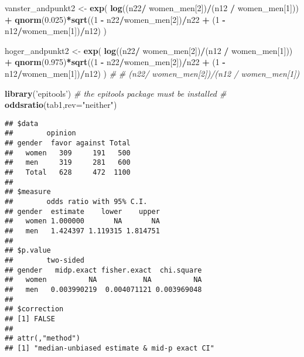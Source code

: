 \documentclass[]{article}
\newenvironment{Shaded}{\begin{snugshade}}{\end{snugshade}}
\newcommand{\CommentTok}[1]{\textcolor[rgb]{0.56,0.35,0.01}{\textit{#1}}}
\newcommand{\DataTypeTok}[1]{\textcolor[rgb]{0.13,0.29,0.53}{#1}}
\newcommand{\DecValTok}[1]{\textcolor[rgb]{0.00,0.00,0.81}{#1}}
\newcommand{\FloatTok}[1]{\textcolor[rgb]{0.00,0.00,0.81}{#1}}
\newcommand{\KeywordTok}[1]{\textcolor[rgb]{0.13,0.29,0.53}{\textbf{#1}}}
\newcommand{\NormalTok}[1]{#1}
\newcommand{\OperatorTok}[1]{\textcolor[rgb]{0.81,0.36,0.00}{\textbf{#1}}}
\newcommand{\StringTok}[1]{\textcolor[rgb]{0.31,0.60,0.02}{#1}}
\begin{document}
\begin{Shaded}
\begin{Highlighting}[]
\NormalTok{vanster_andpunkt2 <-}\StringTok{ }\KeywordTok{exp}\NormalTok{(}
  \KeywordTok{log}\NormalTok{((n22}\OperatorTok{/}\StringTok{ }\NormalTok{women_men[}\DecValTok{2}\NormalTok{])}\OperatorTok{/}\NormalTok{(n12 }\OperatorTok{/}\StringTok{ }\NormalTok{women_men[}\DecValTok{1}\NormalTok{])) }\OperatorTok{+}\StringTok{ }\KeywordTok{qnorm}\NormalTok{(}\FloatTok{0.025}\NormalTok{)}\OperatorTok{*}\KeywordTok{sqrt}\NormalTok{((}\DecValTok{1} \OperatorTok{-}\StringTok{ }\NormalTok{n22}\OperatorTok{/}\NormalTok{women_men[}\DecValTok{2}\NormalTok{])}\OperatorTok{/}\NormalTok{n22 }\OperatorTok{+}\StringTok{ }\NormalTok{(}\DecValTok{1} \OperatorTok{-}\StringTok{ }\NormalTok{n12}\OperatorTok{/}\NormalTok{women_men[}\DecValTok{1}\NormalTok{])}\OperatorTok{/}\NormalTok{n12)}
\NormalTok{)}

\NormalTok{hoger_andpunkt2 <-}\StringTok{ }\KeywordTok{exp}\NormalTok{(}
  \KeywordTok{log}\NormalTok{((n22}\OperatorTok{/}\StringTok{ }\NormalTok{women_men[}\DecValTok{2}\NormalTok{])}\OperatorTok{/}\NormalTok{(n12 }\OperatorTok{/}\StringTok{ }\NormalTok{women_men[}\DecValTok{1}\NormalTok{])) }\OperatorTok{+}\StringTok{ }\KeywordTok{qnorm}\NormalTok{(}\FloatTok{0.975}\NormalTok{)}\OperatorTok{*}\KeywordTok{sqrt}\NormalTok{((}\DecValTok{1} \OperatorTok{-}\StringTok{ }\NormalTok{n22}\OperatorTok{/}\NormalTok{women_men[}\DecValTok{2}\NormalTok{])}\OperatorTok{/}\NormalTok{n22 }\OperatorTok{+}\StringTok{ }\NormalTok{(}\DecValTok{1} \OperatorTok{-}\StringTok{ }\NormalTok{n12}\OperatorTok{/}\NormalTok{women_men[}\DecValTok{1}\NormalTok{])}\OperatorTok{/}\NormalTok{n12)}
\NormalTok{)}
\CommentTok{#   }
\CommentTok{# (n22/ women_men[2])/(n12 / women_men[1]) }

\KeywordTok{library}\NormalTok{(}\StringTok{'epitools'}\NormalTok{) }\CommentTok{# the epitools package must be installed #}
\KeywordTok{oddsratio}\NormalTok{(tab1,}\DataTypeTok{rev=}\StringTok{"neither"}\NormalTok{)}
\end{Highlighting}
\end{Shaded}

\begin{verbatim}
## $data
##        opinion
## gender  favor against Total
##   women   309     191   500
##   men     319     281   600
##   Total   628     472  1100
## 
## $measure
##        odds ratio with 95% C.I.
## gender  estimate    lower    upper
##   women 1.000000       NA       NA
##   men   1.424397 1.119315 1.814751
## 
## $p.value
##        two-sided
## gender   midp.exact fisher.exact  chi.square
##   women          NA           NA          NA
##   men   0.003990219  0.004071121 0.003969048
## 
## $correction
## [1] FALSE
## 
## attr(,"method")
## [1] "median-unbiased estimate & mid-p exact CI"
\end{verbatim}
\end{document}
